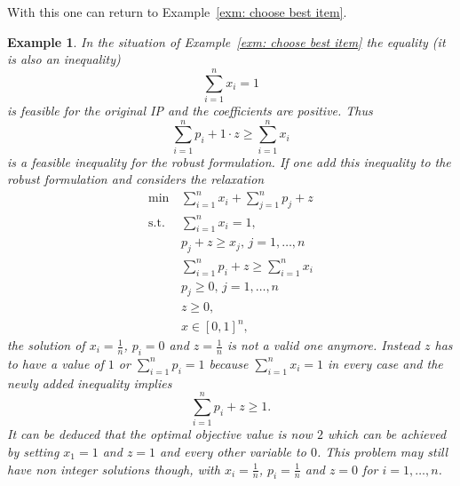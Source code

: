 \documentclass[titlepage, a4paper]{amsbook}
\theoremstyle{plain}
\theoremstyle{break}
\newtheorem{exm}[thm]{Example}
\theoremstyle{definition}
\theoremstyle{remark}
\numberwithin{equation}{thm}
\begin{document}
With this one can return to Example~\ref{exm: choose best item}.
\begin{exm}\label{exm: demonstrate power of cliques}
In the situation of Example~\ref{exm: choose best item} the equality (it is also an inequality) 
\[\sum_{i=1}^{n}x_i =1\]
is feasible for the original IP and the coefficients are positive.
Thus \[\sum_{i=1}^{n}p_i + 1 \cdot z \geq \sum_{i=1}^{n}x_i\]
is a feasible inequality for the robust formulation. If one add this inequality to the robust formulation and considers the relaxation
\begin{equation*}
    \begin{split}
        \min \, &\sum_{i=1}^{n}x_i + \sum_{j=1}^{n}p_j + z\\
        \text{s.t. } &\sum_{i=1}^{n}x_i = 1, \\
        &p_j+ z \geq x_j, \, j=1, \ldots,n\\
        & \sum_{i=1}^{n}p_i + z \geq \sum_{i=1}^{n}x_i \\
     &p_j \geq 0, \, j=1, \ldots, n \\
    &z \geq 0, \\
    &x \in [0,1]^n,
    \end{split}
\end{equation*}
the solution of $x_i=\frac{1}{n}$, $p_i = 0$ and $z=\frac{1}{n}$ is not a valid one anymore. Instead $z$ has to have a value of $1$ or $\sum_{i=1}^{n}p_i = 1$ because $\sum_{i=1}^{n}x_i = 1$ in every case and the newly added inequality implies
\[\sum_{i=1}^{n}p_i + z \geq 1.\]
It can be deduced that the optimal objective value is now $2$ which can be achieved by setting $x_1=1$ and $z=1$ and every other variable to $0$. This problem may still have non integer solutions though, with $x_i=\frac{1}{n}$, $p_i=\frac{1}{n}$ and $z=0$ for $i=1, \ldots, n$.
\end{exm}
\end{document}
